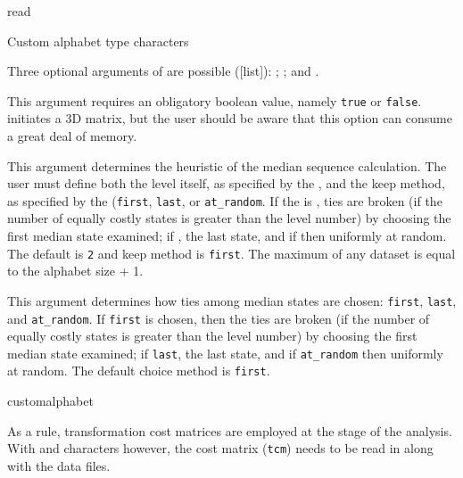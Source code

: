 \begin{command}{read}{}
\begin{arguments}
\begin{argumentgroup}{Custom alphabet type characters}
{Three optional arguments of  are possible ([\poylident list]): 
; ; and . 

\begin{description}

 {\obligatory\poybool}
{This argument requires an obligatory boolean value, namely \texttt{true} or \texttt{false}.
 initiates a 3D matrix, but the user should be aware 
that this option can consume a great deal of memory.}
{}

{This argument determines the heuristic  of the median sequence calculation. 
The user must define both the level itself, as specified by the \poyint, and the keep method, as specified 
by the \poylident (\texttt{first}, \texttt{last}, or \texttt{at\_random}. If the \poylident is , 
ties are broken (if the number of equally costly states is greater than the level number) by choosing the 
first median state examined; if , the last state, and if 
then uniformly at random. The default  is \texttt{2} and keep method is \texttt{first}. 
The maximum  of any dataset is equal to the alphabet size + 1.}
{}

{This argument determines how ties among median states are chosen: \texttt{first}, \texttt{last}, 
and \texttt{at\_random}. If \texttt{first} is chosen, then the ties are broken (if the number of 
equally costly states is greater than the level number) by choosing the first median state examined; 
if \texttt{last}, the last state, and if \texttt{at\_random} then uniformly at random. The default choice method is \texttt{first}.}
{}

\end{description}

}
{customalphabet}

\end{argumentgroup}

\begin{statement}
As a rule, transformation cost matrices are employed at the  stage of the
analysis. With  and  characters however, 
the cost matrix (\texttt{tcm}) needs to be read in along with the data files.
\end{statement}


\end{arguments}
\end{command}
